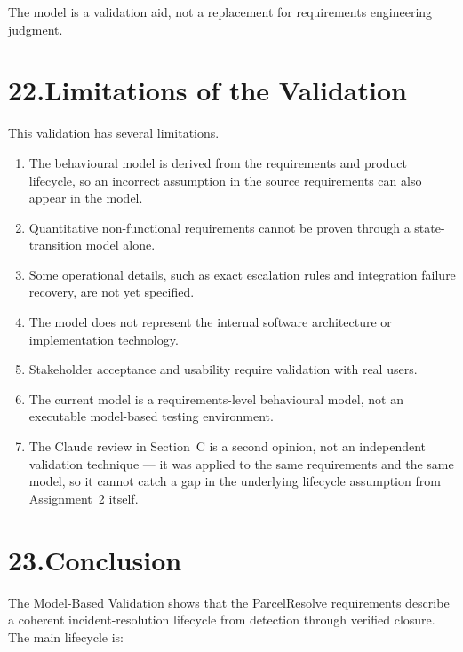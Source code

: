 \documentclass[11pt,a4paper]{article}
\begin{document}
The model is a validation aid, not a replacement for requirements engineering judgment.

\section*{22.\enspace Limitations of the Validation}

This validation has several limitations.

\begin{enumerate}
  \item The behavioural model is derived from the requirements and product lifecycle, so an incorrect assumption in the source requirements can also appear in the model.
  \item Quantitative non-functional requirements cannot be proven through a state-transition model alone.
  \item Some operational details, such as exact escalation rules and integration failure recovery, are not yet specified.
  \item The model does not represent the internal software architecture or implementation technology.
  \item Stakeholder acceptance and usability require validation with real users.
  \item The current model is a requirements-level behavioural model, not an executable model-based testing environment.
  \item The Claude review in Section~C is a second opinion, not an independent validation technique — it was applied to the same requirements and the same model, so it cannot catch a gap in the underlying lifecycle assumption from Assignment~2 itself.
\end{enumerate}

\section*{23.\enspace Conclusion}

The Model-Based Validation shows that the ParcelResolve requirements describe a coherent incident-resolution lifecycle from detection through verified closure. The main lifecycle is:
\end{document}
